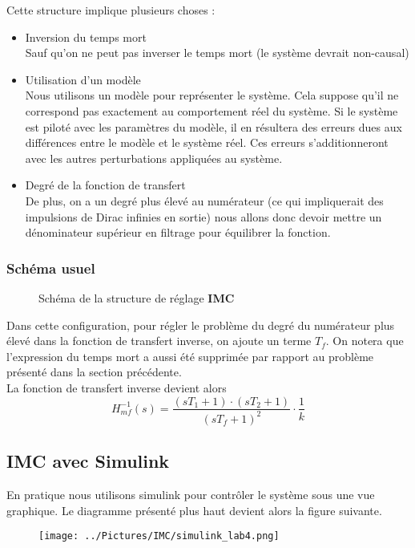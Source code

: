 Cette structure implique plusieurs choses :
\begin{itemize}
\item Inversion du temps mort\\
Sauf qu'on ne peut pas inverser le temps mort (le système devrait non-causal)

\item Utilisation d'un modèle\\
Nous utilisons un modèle pour représenter le système. Cela suppose qu'il ne correspond pas exactement au comportement réel du système. Si le système est piloté avec les paramètres du modèle, il en résultera des erreurs dues aux différences entre le modèle et le système réel. Ces erreurs s'additionneront avec les autres perturbations appliquées au système. 
 
\item Degré de la fonction de transfert\\
De plus, on a un degré plus élevé au numérateur (ce qui impliquerait des impulsions de Dirac infinies en sortie) nous allons donc devoir mettre un dénominateur supérieur en filtrage pour équilibrer la fonction.
\end{itemize}

\subsubsection{Schéma usuel}
\begin{figure}[H]

\caption{Schéma de la structure de réglage \textbf{IMC}}
\end{figure}

Dans cette configuration, pour régler le problème du degré du numérateur plus élevé dans la fonction de transfert inverse, on ajoute un terme $T_{f}$. On notera que l'expression du temps mort a aussi été supprimée par rapport au problème présenté dans la section précédente.\\

La fonction de transfert inverse devient alors 
\begin{equation}
H_{mf}^{-1}(s) = \frac{(sT_{1} + 1) \cdot (sT_{2} + 1)}{(sT_{f} + 1)^{2}} \cdot \frac{1}{k}
\end{equation}

\subsection{IMC avec Simulink}
En pratique nous utilisons simulink pour contrôler le système sous une vue graphique. Le diagramme présenté plus haut devient alors la figure suivante.
\begin{figure}[H]
\texttt{[image: ../Pictures/IMC/simulink\_lab4.png]}
\end{figure}

